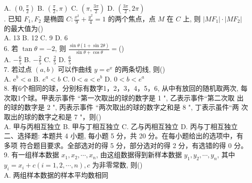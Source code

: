\documentclass[UTF8]{ctexart}
\begin{document}
	A. $\left(0, \displaystyle{\frac{\pi}{2}}\right)$\qquad
	B. $\left(\displaystyle{\frac{\pi}{2}}, \pi\right)$\qquad
	C. $\left(\pi, \displaystyle{\frac{3 \pi}{2}}\right)$\qquad
	D. $\left(\displaystyle{\frac{3 \pi}{2}}, 2 \pi\right)$\\
		. 已知 $F_{1}, F_{2}$ 是椭圆 $C: \displaystyle{\frac{x^{2}}{9}}+\displaystyle{\frac{y^{2}}{4}}=1$ 的两个焦点，点 $M$ 在 $C$ 上, 则 $\left|M F_{1}\right| \cdot\left|M F_{2}\right|$ 的最大值为(\qquad)\\
	
	A. 13\qquad
	B. 12\qquad
	C. 9\qquad
	D. 6\\
	
	6. 若 $\tan \theta=-2$, 则 $ \displaystyle{\frac{\sin \theta(1+\sin 2 \theta)}{\sin \theta+\cos \theta}}=$(\qquad)\\
	
	A. $-\displaystyle{\frac{6}{5}}$\qquad
	B. $-\displaystyle{\frac{2}{5}}$\qquad
	C. $\displaystyle{\frac{2}{5}}$\qquad
	D. $\displaystyle{\frac{6}{5}}$ 
	\\
	
	7. 若过点 $(a, b)$ 可以作曲线 $y=\mathrm{e}^{x}$ 的两条切线, 则(\qquad)\\
	
	A. $\mathrm{e}^{b}<a$\qquad
	B. $e^{a}<b$\qquad
	C. $0<a<\mathrm{e}^{b}$\qquad
	D. $0<b<e^{a}$\\
	
	8. 有6个相同的球，分别标有数字1，2，3，4，5，6, 从中有放回的随机取两次,
	每次取1个球。甲表示事件 “第一次取出的球的数字是 1 ", 乙表示事件“第二次取
	出的球的数字是 2 ", 丙表示事件 “两次取出的球的数字之和是 8 ", 丁表示虽件“两
	次取出的球的数字之和是 7 "，则(\qquad)\\
	
 \noindent	A. 甲与丙相互独立\qquad
	B. 甲与丁相互独立\qquad
	C. 乙与丙相互独立\qquad
	D. 丙与丁相互独立\\
	
	二、选择题: 本题共 4 小题, 每小题 5 分，共 20 分。在每小题给出的选项中，有多项
	符合题目要求。全部选对的得 5 分，部分选对的得 2 分，有选错的得 0 分。\\
	
	9. 有一组样本数据 $x_{1}, x_{2}, \cdots, x_{n}$, 由这组数据得到新样本数据 $y_{1}, y_{2}, \cdots, y_{n}$, 其中
	$y_{i}=x_{i}+c(i=1,2, \cdots, n), c$ 为非零常数, 则(\qquad)\\
	
	A. 两组样本数据的样本平均数相同\\
\end{document}
